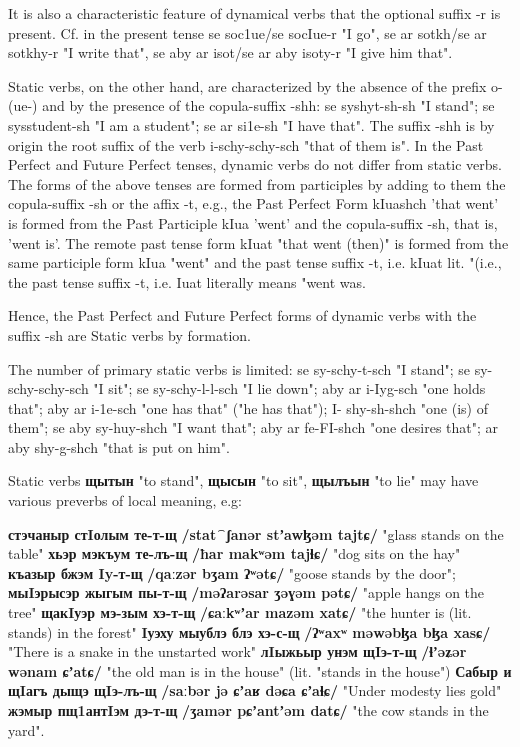 \documentclass[a4paper,12pt]{book}
\newcommand{\1}[1]{\textbf{\emph{#1}}} %
\newcommand{\2}[1]{\textbf{[#1]}} %
\newcommand{\3}[1]{\fontsize{11pt}{0cm}\textbf{\emph{#1}}} %
\newcommand{\4}[1]{\fontsize{10pt}{0cm}\emph{#1}}	%
\newcommand{\5}[1]{\textbf{/#1/}} %
\newcommand{\6}[1]{\textbf{[#1]}} %
\newcommand{\7}[1]{\fontsize{12pt}{0cm}\emph{#1}} %
\newcommand{\8}[1]{\fontsize{12pt}{0cm}`#1'} %
\newcommand{\9}[1]{\fontsize{12pt}{0cm}(lit. `#1')} %
\newcommand{\glossphonemics}[1]{\textbf{/#1/}} %
\begin{document}
It is also a characteristic feature of dynamical verbs that the optional suffix -r is present. Cf. in the present tense se soc1ue/se socIue-r "I go", se ar sotkh/se ar sotkhy-r "I write that", se aby ar isot/se ar aby isoty-r "I give him that".

Static verbs, on the other hand, are characterized by the absence of the prefix o- (ue-) and by the presence of the copula-suffix -shh: se syshyt-sh-sh "I stand"; se sysstudent-sh "I am a student"; se ar si1e-sh "I have that". The suffix -shh is by origin the root suffix of the verb i-schy-schy-sch "that of them is". In the Past Perfect and Future Perfect tenses, dynamic verbs do not differ from static verbs. The forms of the above tenses are formed from participles by adding to them the copula-suffix -sh or the affix -t, e.g., the Past Perfect Form kIuashch 'that went' is formed from the Past Participle kIua 'went' and the copula-suffix -sh, that is, 'went is'. The remote past tense form kIuat "that went (then)" is formed from the same participle form kIua "went" and the past tense suffix -t, i.e. kIuat lit. "(i.e., the past tense suffix -t, i.e. Iuat literally means "went was.

Hence, the Past Perfect and Future Perfect forms of dynamic verbs with the suffix -sh are Static verbs by formation.

The number of primary static verbs is limited: se sy-schy-t-sch "I stand"; se sy-schy-schy-sch "I sit"; se sy-schy-l-l-sch "I lie down"; aby ar i-Iyg-sch "one holds that"; aby ar i-1e-sch "one has that" ("he has that"); I- shy-sh-shch "one (is) of them"; se aby sy-huy-shch "I want that"; aby ar fe-FI-shch "one desires that"; ar aby shy-g-shch "that is put on him".

Static verbs \textbf{щытын} "to stand", \textbf{щысын} "to sit", \textbf{щылъын} "to lie" may have various preverbs of local meaning, e.g:

\begin{xlist}
\ex \textbf{стэчаныр стIолым те-т-щ} \glossphonemics{stat⁀ʃanər stʼawɮəm tajtɕ} "glass stands on the table"
\ex \textbf{хьэр мэкъум те-лъ-щ} \glossphonemics{ħar makʷəm tajɬɕ} "dog sits on the hay"
\ex \textbf{къазыр бжэм Iy-т-щ} \glossphonemics{qaːzər bʒam ʔʷətɕ} "goose stands by the door"; 
\ex \textbf{мыIэрысэр жыгым пы-т-щ} \glossphonemics{məʔarəsar ʒəɣəm pətɕ}  "apple hangs on the tree"
\ex \textbf{щакIуэр мэ-зым хэ-т-щ} \glossphonemics{ɕaːkʷʼar mazəm xatɕ} "the hunter is (lit. stands) in the forest"
\ex \textbf{Iуэху мыублэ блэ хэ-с-щ} \glossphonemics{ʔʷaxʷ məwəbɮa bɮa xasɕ} "There is a snake in the unstarted work"
\ex \textbf{лIыжьыр унэм щIэ-т-щ} \glossphonemics{ɬʼəʑər wənam ɕʼatɕ} "the old man is in the house" (lit. "stands in the house")
\ex \textbf{Сабыр и щIагъ дыщэ щIэ-лъ-щ} \glossphonemics{saːbər jə ɕʼaʁ dəɕa ɕʼaɬɕ} "Under modesty lies gold"
\ex \textbf{жэмыр пщ1антIэм дэ-т-щ} \glossphonemics{ʒamər pɕʼantʼəm datɕ} "the cow stands in the yard".
\end{xlist}
\end{document}
